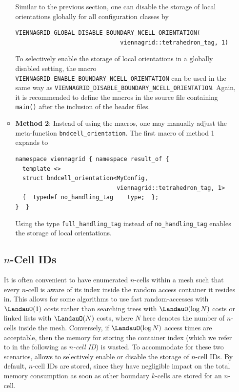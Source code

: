 \begin{itemize}
\begin{itemize}
Similar to the previous section, one can disable the storage of local orientations globally for all configuration classes by
\begin{lstlisting}
VIENNAGRID_GLOBAL_DISABLE_BOUNDARY_NCELL_ORIENTATION(
                              viennagrid::tetrahedron_tag, 1)
\end{lstlisting}
To selectively enable the storage of local orientations in a globally disabled setting, the macro \lstinline|VIENNAGRID_ENABLE_BOUNDARY_NCELL_ORIENTATION| can be used in the same way as \lstinline|VIENNAGRID_DISABLE_BOUNDARY_NCELL_ORIENTATION|.
Again, it is recommended to define the macros in the source file containing \lstinline|main()| after the inclusion of the {\ViennaGrid} header files.

 \item \textbf{Method 2}: Instead of using the macros, one may manually adjust the meta-function \lstinline|bndcell_orientation|. The first macro of method 1 expands to
 \begin{lstlisting}
namespace viennagrid { namespace result_of {
  template <>
  struct bndcell_orientation<MyConfig,
                             viennagrid::tetrahedron_tag, 1>
  {  typedef no_handling_tag    type;  };
}  }
 \end{lstlisting}
Using the type \lstinline|full_handling_tag| instead of \lstinline|no_handling_tag| enables the storage of local orientations.
\end{itemize}


\subsection{$n$-Cell IDs} \label{subsec:ncell-ids}
It is often convenient to have enumerated $n$-cells within a mesh such that every $n$-cell is aware of its index inside the random access container it resides in. This allows for some algorithms to use fast random-accesses with $\LandauO(1)$ costs rather than searching trees with $\LandauO(\log N)$ costs or linked lists with $\LandauO(N)$ costs, where $N$ here denotes the number of $n$-cells inside the mesh. Conversely, if $\LandauO(\log N)$ access times are acceptable, then the memory for storing the container index (which we refer to in the following as \emph{$n$-cell ID}) is wasted. To accommodate for these two scenarios, {\ViennaGrid} allows to selectively enable or disable the storage of $n$-cell IDs. By default, $n$-cell IDs are stored, since they have negligible impact on the total memory consumption as soon as other boundary $k$-cells are stored for an $n$-cell.


\end{itemize}
